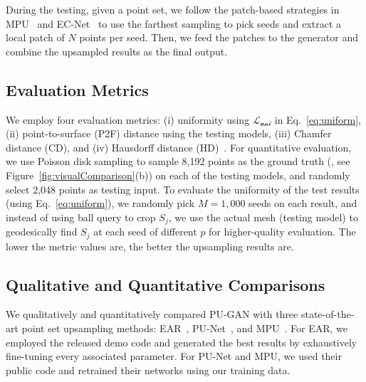 During the testing, given a point set, we follow the patch-based strategies in MPU~\cite{yifan2018patch} and EC-Net~\cite{yu2018ec} to use the farthest sampling to pick seeds and extract a local patch of $N$ points per seed.
Then, we feed the patches to the generator and combine the upsampled results as the final output.




\subsection{Evaluation Metrics}
\label{subsec:evaluation}
We employ four evaluation metrics: (i) uniformity using $\mathcal{L_{\text{uni}}}$ in Eq.~\eqref{eq:uniform}, (ii) point-to-surface (P2F) distance using the testing models, (iii) Chamfer distance (CD), and (iv) Hausdorff distance (HD)~\cite{berger2013benchmark}.
For quantitative evaluation, we use Poisson disk sampling to sample 8,192 points as the ground truth (\eg, see Figure~\ref{fig:visualComparison}(b)) on each of the testing models, and randomly select 2,048 points as testing input.
To evaluate the uniformity of the test results (using Eq.~\eqref{eq:uniform}), we randomly pick $M=1,000$ seeds on each result, and instead of using ball query to crop $S_j$, we use the actual mesh (testing model) to geodesically find $S_j$ at each seed of different $p$ for higher-quality evaluation.
The lower the metric values are, the better the upsampling results are.




\subsection{Qualitative and Quantitative Comparisons}
\label{subsec:comparison}

We qualitatively and quantitatively compared PU-GAN with three state-of-the-art point set upsampling methods: EAR~\cite{huang2013edge}, PU-Net~\cite{yu2018pu}, and MPU~\cite{yifan2018patch}.
For EAR, we employed the released demo code and generated the best results by exhaustively fine-tuning every associated parameter.
For PU-Net and MPU, we used their public code and retrained their networks using our training data.


